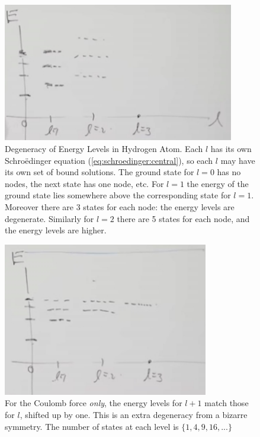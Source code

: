\documentclass[]{article}
\begin{document}
\begin{figure}[H]
	\begin{center}
		\caption[Degeneracy of Energy Levels in Hydrogen Atom]{Degeneracy of Energy Levels in Hydrogen Atom. Each $l$ has its own Schro\"edinger equation (\ref{eq:schroedinger:central}), so each $l$ may have its own set of bound solutions. The ground state for $l=0$ has no nodes,  the next state has one node, etc. For $l=1$ the energy of the ground state lies somewhere above the corresponding state for $l=1$. Moreover there are 3 states for each node: the energy levels are degenerate. Similarly for $l=2$ there are 5 states for each node, and the energy levels are higher.}\label{fig:degeneracy:hydrogen}
		\includegraphics[width=0.9\textwidth]{aqm-3-hydrogen-degeneracy}
	\end{center}
\end{figure}

\begin{figure}[H]
	\begin{center}
		\caption[Energy Levels for the Coulomb Force]{For the Coulomb force \emph{only}, the energy levels for $l+1$ match those for $l$, shifted up by one. This is an extra degeneracy from a bizarre symmetry. The number of states at each level is  $\{1,4,9,16,...\}$}\label{fig:aqm-3-central-coulomb}
		\includegraphics[width=0.8\textwidth]{aqm-3-central-coulomb}
	\end{center}
\end{figure}
\end{document}
